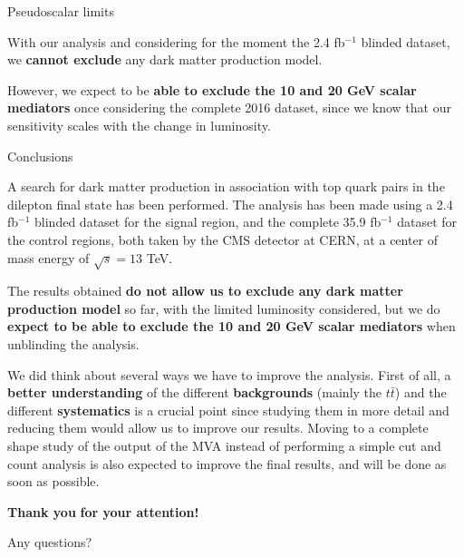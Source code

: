 \documentclass[handout,8 pt]{beamer}
\begin{document}
\begin{frame}{Pseudoscalar limits}
   \vspace{-10pt}
   \begin{block}{}
   \justifying
   \vspace{5pt}
	With our analysis and considering for the moment the 2.4 fb$^{-1}$ blinded dataset, we \textbf{cannot exclude} any dark matter production model. \vspace{5pt}
	\end{block} \vfill
	
	\justifying
	However, we expect to be \textbf{able to exclude the 10 and 20 GeV scalar mediators} once considering the complete 2016 dataset, since we know that our sensitivity scales with the change in luminosity. \vfill
   

\end{frame}


\begin{frame}{Conclusions}

	\justifying
	A search for dark matter production in association with top quark pairs in the dilepton final state has been performed. The analysis has been made using a 2.4 fb$^{-1}$ blinded dataset for the signal region, and the complete 35.9 fb$^{-1}$ dataset for the control regions, both taken by the CMS detector at CERN, at a center of mass energy of $\sqrt{s} = 13$ TeV. \vfill
	
	The results obtained \textbf{do not allow us to exclude any dark matter production model} so far, with the limited luminosity considered, but we do \textbf{expect to be able to exclude the 10 and 20 GeV scalar mediators} when unblinding the analysis. \vfill
	
	We did think about several ways we have to improve the analysis. First of all, a \textbf{better understanding} of the different \textbf{backgrounds} (mainly the $t \bar t$) and the different \textbf{systematics} is a crucial point since studying them in more detail and reducing them would allow us to improve our results. Moving to a complete shape study of the output of the MVA instead of performing a simple cut and count analysis is also expected to improve the final results, and will be done as soon as possible. \vfill

\end{frame}



\begin{frame}{}

	\centering
	\huge{\textbf{\color{mycolor} Thank you  \color{black}}} \newline
	\LARGE{\textbf{\color{mycolor} for your attention! \color{black}}} \vfill

	Any questions? \vfill

\end{frame}
\end{document}
